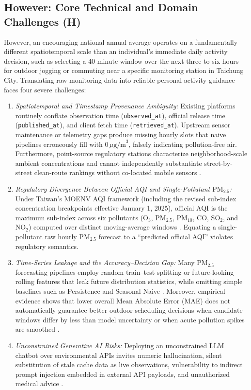 \subsection{However: Core Technical and Domain Challenges (H)}
However, an encouraging national annual average operates on a fundamentally different spatiotemporal scale than an individual's immediate daily activity decision, such as selecting a 40-minute window over the next three to six hours for outdoor jogging or commuting near a specific monitoring station in Taichung City. Translating raw monitoring data into reliable personal activity guidance faces four severe challenges:
\begin{enumerate}
    \item \emph{Spatiotemporal and Timestamp Provenance Ambiguity:} Existing platforms routinely conflate observation time (\texttt{observed\_at}), official release time (\texttt{published\_at}), and client fetch time (\texttt{retrieved\_at}). Upstream sensor maintenance or telemetry gaps produce missing hourly slots that naive pipelines erroneously fill with $0\,\mu\text{g/m}^3$, falsely indicating pollution-free air. Furthermore, point-source regulatory stations characterize neighborhood-scale ambient concentrations and cannot independently substantiate street-by-street clean-route rankings without co-located mobile sensors \cite{steinle2018,epa2024}.
    \item \emph{Regulatory Divergence Between Official AQI and Single-Pollutant $\text{PM}_{2.5}$:} Under Taiwan's MOENV AQI framework (including the revised sub-index concentration breakpoints effective January 1, 2025), official AQI is the maximum sub-index across six pollutants ($\text{O}_3$, $\text{PM}_{2.5}$, $\text{PM}_{10}$, $\text{CO}$, $\text{SO}_2$, and $\text{NO}_2$) computed over distinct moving-average windows \cite{moenv2025aqi}. Equating a single-pollutant raw hourly $\text{PM}_{2.5}$ forecast to a ``predicted official AQI'' violates regulatory semantics.
    \item \emph{Time-Series Leakage and the Accuracy--Decision Gap:} Many $\text{PM}_{2.5}$ forecasting pipelines employ random train--test splitting or future-looking rolling features that leak future distribution statistics, while omitting simple baselines such as Persistence and Seasonal Naive \cite{chianese2026,hewamalage2023,lu2026}. Moreover, empirical evidence shows that lower overall Mean Absolute Error (MAE) does not automatically guarantee better outdoor scheduling decisions when candidate windows differ by less than model uncertainty or when acute pollution spikes are smoothed \cite{berlinghieri2026}.
    \item \emph{Unconstrained Generative AI Risks:} Deploying an unconstrained LLM chatbot over environmental APIs invites numeric hallucination, silent substitution of stale cache data as live observations, vulnerability to indirect prompt injection embedded in external API payloads, and unauthorized medical advice \cite{yao2023,nie2025,owasp2026}.
\end{enumerate}

